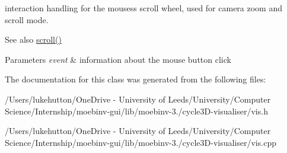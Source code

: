 interaction handling for the mouses\textquotesingle{}s scroll wheel, used for camera zoom and scroll mode.

\begin{DoxySeeAlso}{See also}
\mbox{\hyperlink{classvis_addb1c0bca50661279c4ddaa441b54da5}{scroll()}} 
\end{DoxySeeAlso}

\begin{DoxyParams}{Parameters}
{\em event} & information about the mouse button click \\
\hline
\end{DoxyParams}


The documentation for this class was generated from the following files\+:\begin{DoxyCompactItemize}
\item 
/\+Users/lukehutton/\+One\+Drive -\/ University of Leeds/\+University/\+Computer Science/\+Internship/moebinv-\/gui/lib/moebinv-\/3./cycle3\+D-\/visualiser/vis.\+h\item 
/\+Users/lukehutton/\+One\+Drive -\/ University of Leeds/\+University/\+Computer Science/\+Internship/moebinv-\/gui/lib/moebinv-\/3./cycle3\+D-\/visualiser/vis.\+cpp\end{DoxyCompactItemize}
